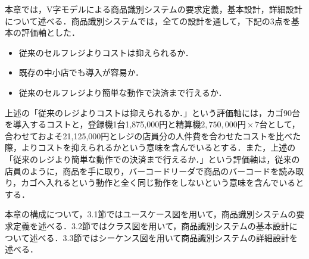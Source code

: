

本章では，V字モデルによる商品識別システムの要求定義，基本設計，詳細設計について述べる．商品識別システムでは，全ての設計を通して，下記の3点を基本の評価軸とした．

\begin{itemize}
\item 従来のセルフレジよりコストは抑えられるか．
\item 既存の中小店でも導入が容易か．
\item 従来のセルフレジより簡単な動作で決済まで行えるか．
\end{itemize}


上述の「従来のレジよりコストは抑えられるか．」という評価軸には，カゴ90台を導入するコストと，登録機1台1,875,000円と精算機$2,750,000円\times7台$として，合わせておよそ21,125,000円\cite{super}とレジの店員分の人件費を合わせたコストを比べた際，よりコストを抑えられるかという意味を含んでいるとする．また，上述の「従来のレジより簡単な動作での決済まで行えるか．」という評価軸は，従来の店員のように，商品を手に取り，バーコードリーダで商品のバーコードを読み取り，カゴへ入れるという動作と全く同じ動作をしないという意味を含んでいるとする．


本章の構成について，3.1節ではユースケース図を用いて，商品識別システムの要求定義を述べる．3.2節ではクラス図を用いて，商品識別システムの基本設計について述べる．3.3節ではシーケンス図を用いて商品識別システムの詳細設計を述べる．